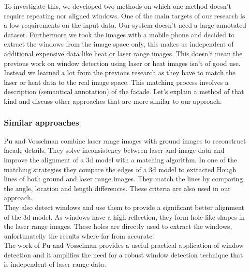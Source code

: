 
To investigate this, we developed two methods on which one method doesn't
require repeating nor aligned windows.  One of the main targets of our research
is a low requirements on the input data.  Our system doesn't need 
a large annotated dataset. Furthermore we took the images with a mobile phone
and decided to extract the windows from the image space only, this makes us
independent of additional expensive data like heat or laser range images.
This doesn't mean the previous work on window detection using laser or heat
images isn't of good use.  Instead we learned a lot from the previous research
as they have to match the laser or heat data to the real image space.  This
matching process involves a description (semantical annotation) of the facade.
Let's explain a method of that kind and discuss other approaches that are more
similar to our approach.\\

\subsubsection{Similar approaches}
Pu and Vosselman \cite{Pu_refiningbuilding} combine laser range images with
ground images to reconstruct facade details.  They solve inconsistency between
laser and image data and improve the alignment of a 3d model with a matching
algorithm.  In one of the matching strategies they compare the edges of a 3d
model to extracted Hough lines of both ground and laser range images.  They
match the lines by comparing the angle, location and length differences. These
criteria are also used in our approach.\\

They also detect windows and use them to provide a significant better alignment
of the 3d model.  As windows have a high reflection, they form hole like shapes
in the laser range images.  These holes are directly used to extract the
windows, unfortunatelly the results where far from accurate.\\

The work of Pu and Vosselman \cite{Pu_refiningbuilding} provides a useful
practical application of window detection and it amplifies the need for a robust
window detection technique that is independent of laser range data.\\


